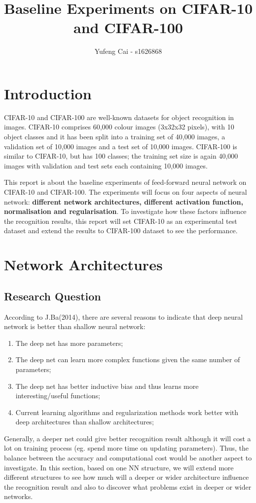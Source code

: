 \documentclass[]{article}
\begin{document}
\title{Baseline Experiments on CIFAR-10 and CIFAR-100}
\author{Yufeng Cai - s1626868}
\maketitle
\section{Introduction}
CIFAR-10 and CIFAR-100 are well-known datasets for object recognition in images. CIFAR-10 comprises 60,000 colour images (3x32x32 pixels), with 10 object classes and it has been split into a training set of 40,000 images, a validation set of 10,000 images and a test set of 10,000 images. CIFAR-100 is similar to CIFAR-10, but has 100 classes; the training set size is again 40,000 images with validation and test sets each containing 10,000 images.

This report is about the baseline experiments of feed-forward neural network on CIFAR-10 and CIFAR-100. The experiments will focus on four aspects of neural network: \textbf{different network architectures, different activation function, normalisation and regularisation}. To investigate how these factors influence the recognition results, this report will set CIFAR-10 as an experimental test dataset and extend the results to CIFAR-100 dataset to see the performance.
\section{Network Architectures}
\subsection{Research Question}
According to J.Ba(2014), there are several reasons to indicate that deep neural network is better than shallow neural network:
\begin{enumerate}[ a)]
\item The deep net has more parameters; 
\item The deep net can learn more complex functions given the same number of parameters; 
\item The deep net has better inductive bias and thus learns more interesting/useful functions;
\item Current learning algorithms and regularization methods work better with deep architectures than shallow architectures; 
\end{enumerate}

Generally, a deeper net could give better recognition result although it will cost a lot on training process (eg. spend more time on updating parameters). Thus,  the balance between the accuracy and computational cost would be another aspect to investigate. In this section, based on one NN structure, we will extend more different structures to see how much will a deeper or wider architecture influence the recognition result and also to discover what problems exist in deeper or wider networks.
\end{document}
